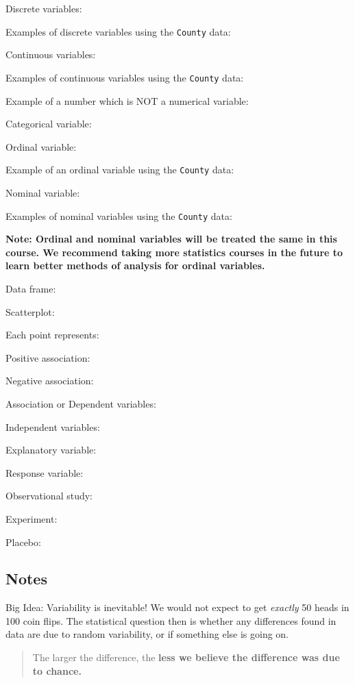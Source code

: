 \documentclass[
]{report}
\newcommand{\rgs}{\vspace{12pt}} %
\newcommand{\rgi}{\hspace{20pt}}  %
\begin{document}
\rgi Discrete variables:
\rgs

\rgi \rgi Examples of discrete variables using the \texttt{County} data:
\rgs

\rgi Continuous variables:
\rgs

\rgi \rgi Examples of continuous variables using the \texttt{County} data:
\rgs

Example of a number which is NOT a numerical variable:
\rgs

Categorical variable:
\rgs

\rgi Ordinal variable:
\rgs

\rgi \rgi Example of an ordinal variable using the \texttt{County} data:
\rgs

\rgi Nominal variable:
\rgs

\rgi \rgi Examples of nominal variables using the \texttt{County} data:

\rgs

\textbf{Note: Ordinal and nominal variables will be treated the same in this course. We recommend taking more statistics courses in the future to learn better methods of analysis for ordinal variables.}

Data frame:
\rgs

Scatterplot:
\rgs

\rgi Each point represents:

\rgi Positive association:

\rgi Negative association:

Association or Dependent variables:
\rgs

Independent variables:
\rgs

Explanatory variable:
\rgs

Response variable:
\rgs

Observational study:
\rgs

Experiment:
\rgs

Placebo:
\rgs

\hypertarget{notes}{%
\subsection*{Notes}\label{notes}}

Big Idea: Variability is inevitable! We would not expect to get \emph{exactly} 50 heads in 100 coin flips. The statistical question then is whether any differences found in data are due to random variability, or if something else is going on.

\begin{quote}
The larger the difference, the \textbf{less we believe the difference was due to chance.}
\end{quote}
\end{document}

